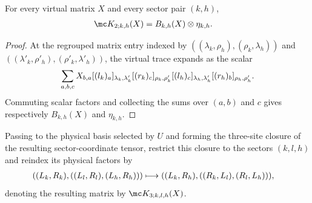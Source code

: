 \begin{lemma}
    \label{thm:mpdo_two_site_sector_closure_factorization}
    \leanok
    For every virtual matrix $X$ and every sector pair $(k,h)$,
    \begin{align}
        \mc K_{2;k,h}(X)
         & =B_{k,h}(X)\otimes\eta_{k,h}.
        \notag
    \end{align}
\end{lemma}
\begin{proof}
    \leanok
    At the regrouped matrix entry indexed by
    $((\lambda_k,\rho_h),(\rho_k,\lambda_h))$ and
    $((\lambda'_k,\rho'_h),(\rho'_k,\lambda'_h))$, the virtual trace expands
    as the scalar
    \begin{align}
        \sum_{a,b,c}X_{b,a}
            [(l_k)_a]_{\lambda_k,\lambda'_k}
            [(r_k)_c]_{\rho_k,\rho'_k}
            [(l_h)_c]_{\lambda_h,\lambda'_h}
            [(r_h)_b]_{\rho_h,\rho'_h}.
        \notag
    \end{align}
    Commuting scalar factors and collecting the sums over $(a,b)$ and $c$
    gives respectively $B_{k,h}(X)$ and $\eta_{k,h}$.
\end{proof}

\begin{definition}
    \label{def:mpdo_three_site_sector_closure}
    \leanok
    Passing to the physical basis selected by $U$ and forming the three-site
    closure of the resulting sector-coordinate tensor, restrict this closure
    to the sectors $(k,l,h)$ and reindex its physical factors by
    \begin{align}
        ((L_k,R_k),((L_l,R_l),(L_h,R_h)))
         & \longmapsto
        ((L_k,R_h),((R_k,L_l),(R_l,L_h))),
        \notag
    \end{align}
    denoting the resulting matrix by $\mc K_{3;k,l,h}(X)$.
\end{definition}

